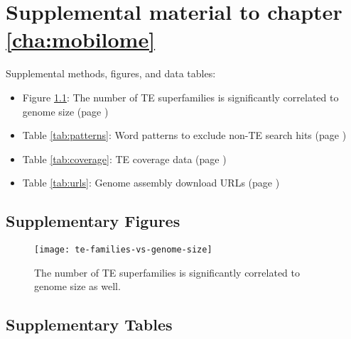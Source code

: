 \chapter{Supplemental material to chapter \ref{cha:mobilome}}

Supplemental methods, figures, and data tables:

\begin{itemize}
	\item Figure \ref{fig:te-families-vs-genome-size}: The number of TE superfamilies is significantly correlated to genome size (page \pageref{fig:te-families-vs-genome-size})
\end{itemize}

\begin{itemize}
	\item Table \ref{tab:patterns}: Word patterns to exclude non-TE search hits (page \pageref{tab:patterns})
	\item Table \ref{tab:coverage}: TE coverage data (page \pageref{tab:coverage})
	\item Table \ref{tab:urls}: Genome assembly download URLs (page \pageref{tab:urls})
\end{itemize}

\section{Supplementary Figures}

\begin{figure}[h]
\centering
\texttt{[image: te-families-vs-genome-size]}
\caption[The number of TE superfamilies is significantly correlated to
genome size]{The number of TE superfamilies is significantly correlated to
genome size as well.}
\label{fig:te-families-vs-genome-size}
\end{figure}


\clearpage

\section{Supplementary Tables}

